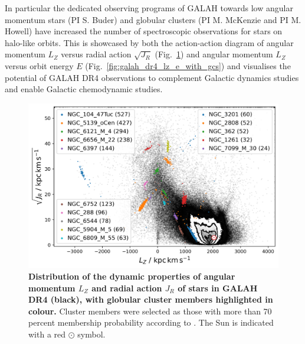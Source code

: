 \documentclass[
  journal=pasa,
  manuscript=research-paper, %
  year=2024,
  volume=37
]{cup-journal}
\begin{document}
In particular the dedicated observing programs of GALAH towards low angular momentum stars (PI S. Buder) and globular clusters (PI M. McKenzie and PI M. Howell) have increased the number of spectroscopic observations for stars on halo-like orbits. This is showcased by both the action-action diagram of angular momentum $L_Z$ versus radial action $\sqrt{J_R}$ (Fig.~\ref{fig:galah_dr4_lz_jr_with_gcs}) and angular momentum $L_Z$ versus orbit energy $E$ (Fig.~\ref{fig:galah_dr4_lz_e_with_gcs}) and visualises the potential of GALAH DR4 observations to complement Galactic dynamics studies and enable Galactic chemodynamic studies.

\begin{figure}[ht]
\includegraphics[width=\columnwidth]{figures/galah_dr4_lz_jr_with_gcs.png}
\caption{
\textbf{Distribution of the dynamic properties of angular momentum $L_Z$ and radial action $J_R$ of stars in GALAH DR4 (black), with globular cluster members highlighted in colour.} Cluster members were selected as those with more than 70 percent membership probability according to \citet{Vasiliev2021}. The Sun is indicated with a red $\odot$ symbol.
}
\label{fig:galah_dr4_lz_jr_with_gcs}
\end{figure}
\end{document}
